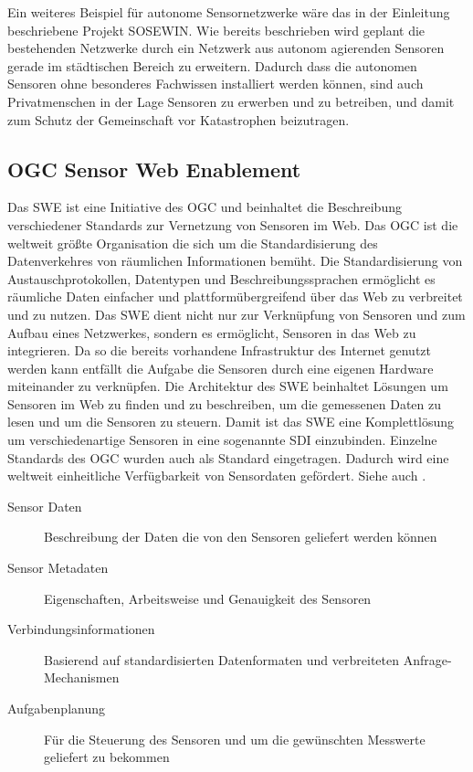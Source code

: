 Ein weiteres Beispiel für autonome Sensornetzwerke wäre das in der Einleitung beschriebene Projekt \gls{SOSEWIN}. Wie bereits beschrieben wird geplant die bestehenden Netzwerke durch ein Netzwerk aus autonom agierenden Sensoren gerade im städtischen Bereich zu erweitern. Dadurch dass die autonomen Sensoren ohne besonderes Fachwissen installiert werden können, sind auch Privatmenschen in der Lage Sensoren zu erwerben und zu betreiben, und damit zum Schutz der Gemeinschaft vor Katastrophen beizutragen.

\subsection{OGC Sensor Web Enablement}
Das  \gls{SWE} ist eine Initiative des  \gls{OGC} und beinhaltet die Beschreibung verschiedener Standards zur Vernetzung von Sensoren im Web. Das \gls{OGC} ist die weltweit größte Organisation die sich um die Standardisierung des Datenverkehres von räumlichen Informationen bemüht. Die Standardisierung von Austauschprotokollen, Datentypen und Beschreibungssprachen ermöglicht es räumliche Daten einfacher und plattformübergreifend über das Web zu verbreitet und zu nutzen. Das \gls{SWE} dient nicht nur zur Verknüpfung von Sensoren und zum Aufbau eines Netzwerkes, sondern es ermöglicht, Sensoren in das Web zu integrieren. Da so die bereits vorhandene Infrastruktur des Internet genutzt werden kann entfällt die Aufgabe die Sensoren durch eine eigenen Hardware miteinander zu verknüpfen. Die Architektur des \gls{SWE} beinhaltet Lösungen um Sensoren im Web zu finden und zu beschreiben, um die gemessenen Daten zu lesen und um die Sensoren zu steuern. Damit ist das \gls{SWE} eine Komplettlösung um verschiedenartige Sensoren in eine sogenannte  \gls{SDI} einzubinden. Einzelne Standards des \gls{OGC} wurden auch als  Standard eingetragen. Dadurch wird eine weltweit einheitliche Verfügbarkeit von Sensordaten gefördert. Siehe auch \citep{botts_ogc_2008}\citep{broring_new_2011} \citep{bermudez_ogc_2011}.



\begin{description}
\item[Sensor Daten] Beschreibung der Daten die von den Sensoren geliefert werden können
\item[Sensor Metadaten] Eigenschaften, Arbeitsweise und Genauigkeit des Sensoren
\item[Verbindungsinformationen] Basierend auf standardisierten Datenformaten und verbreiteten Anfrage-Mechanismen
\item[Aufgabenplanung] Für die Steuerung des Sensoren und um die gewünschten Messwerte geliefert zu bekommen
\end{description}


